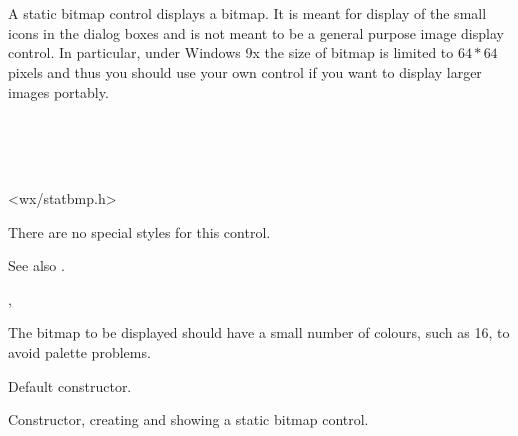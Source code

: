 \section{}\label{wxstaticbitmap}

A static bitmap control displays a bitmap. It is meant for display of the
small icons in the dialog boxes and is not meant to be a general purpose image
display control. In particular, under Windows 9x the size of bitmap is limited
to $64*64$ pixels and thus you should use your own control if you want to
display larger images portably.


\\
\\
\\


<wx/statbmp.h>




There are no special styles for this control.

See also .


, 


The bitmap to be displayed should have a small number of colours, such as 16, to avoid
palette problems.



\label{wxstaticbitmapconstr}


Default constructor.


Constructor, creating and showing a static bitmap control.

